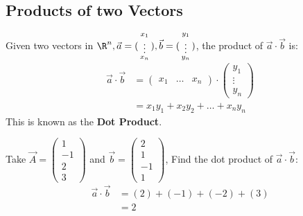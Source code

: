 \documentclass[a4paper]{article}
\begin{document}
  \subsection{Products of two Vectors}
  \begin{theorem}
    Given two vectors in $\R^n ,\vec{a} = (\begin{smallmatrix}x_1 \\ \vdots \\ x_n\end{smallmatrix}), \vec{b} = (\begin{smallmatrix}y_1\\ \vdots \\ y_n\end{smallmatrix})$, the product of $\vec{a} \cdot \vec{b}$ is:
    \begin{displaymath}
      \begin{split}
        \vec{a} \cdot \vec{b} &= \begin{pmatrix}
          x_1 & \dots & x_n 
        \end{pmatrix} \cdot \begin{pmatrix}
          y_1 \\ \vdots \\ y_n
      \end{pmatrix}\\
                              &= x_1y_1 + x_2y_2 + \dots + x_ny_n
      \end{split}
    \end{displaymath}
   This is known as the \textbf{Dot Product}.
  \end{theorem}
  Take $\vec{A} = (\begin{smallmatrix} 1 \\ -1 \\ 2 \\ 3\end{smallmatrix})$ and $\vec{b} = (\begin{smallmatrix}2 \\ 1 \\ -1 \\ 1\end{smallmatrix})$, Find the dot product of $\vec{a} \cdot \vec{b}$:
  \begin{equation}
    \label{eq:2}
    \begin{split}
      \vec{a} \cdot \vec{b} &= (2) + (-1) + (-2) + (3) \\
                            &= 2
    \end{split}
  \end{equation}
\end{document}
